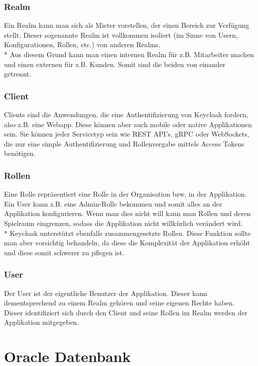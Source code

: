 \subsubsection{Realm}
Ein Realm kann man sich als Mieter vorstellen, der einen Bereich zur Verfügung stellt. Dieser sogenannte Realm ist vollkommen isoliert (im Sinne von Usern, Konfigurationen, Rollen, etc.)
von anderen Realms. \\* Aus diesem Grund kann man einen internen Realm für z.B. Mitarbeiter machen und einen externen für z.B. Kunden. Somit sind die beiden von einander getrennt. \cite{KeyCloakCodex}

\subsubsection{Client}
Clients sind die Anwendungen, die eine Authentifizierung von Keycloak fordern, also z.B. eine Webapp. Diese können aber auch mobile oder native Applikationen sein.
Sie können jeder Servicetyp sein wie REST API's, gRPC oder WebSockets, die nur eine simple Authentifizierung und Rollenvergabe mittels Access Tokens benötigen. \cite{KeyCloakCodex}

\subsubsection{Rollen}
Eine Rolle repräsentiert eine Rolle in der Organisation bzw. in der Applikation. Ein User kann z.B. eine Admin-Rolle bekommen und somit alles an der Applikation konfigurieren.
Wenn man dies nicht will kann man Rollen und deren Spielraum eingrenzen, sodass die Applikation nicht willkürlich verändert wird. \\*
Keycloak unterstützt ebenfalls zusammengesetzte Rollen. Diese Funktion sollte man aber vorsichtig behandeln, da diese die Komplexität der Applikation erhöht und diese somit schwerer zu pflegen ist. \cite{KeyCloakCodex}

\subsubsection{User}
Der User ist der eigentliche Benutzer der Applikation. Dieser kann dementsprechend zu einem Realm gehören und seine eigenen Rechte haben.
Dieser identifiziert sich durch den Client und seine Rollen im Realm werden der Applikation mitgegeben.


\section{Oracle Datenbank}
